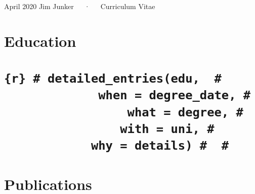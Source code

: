 \documentclass[11pt, a4paper]{awesome-cv}
\begin{document}
\makecvheader

\makecvfooter
  {April 2020}
    {Jim Junker~~~·~~~Curriculum Vitae}
  {\thepage}





\hypertarget{education}{%
\section{Education}\label{education}}

\hypertarget{r-detailed_entriesedu-when-degree_date-what-degree-with-uni-why-details}{%
\section{\texorpdfstring{\texttt{\{r\}\ \#\ detailed\_entries(edu,\ \ \#\ \ \ \ \ \ \ \ \ \ \ \ \ \ \ \ \ \ when\ =\ degree\_date,\ \#\ \ \ \ \ \ \ \ \ \ \ \ \ \ \ \ \ \ what\ =\ degree,\ \#\ \ \ \ \ \ \ \ \ \ \ \ \ \ \ \ \ \ with\ =\ uni,\ \#\ \ \ \ \ \ \ \ \ \ \ \ \ \ \ \ \ \ why\ =\ details)\ \#\ \ \#}}{\{r\} \# detailed\_entries(edu,  \#                  when = degree\_date, \#                  what = degree, \#                  with = uni, \#                  why = details) \#  \#}}\label{r-detailed_entriesedu-when-degree_date-what-degree-with-uni-why-details}}

\hypertarget{publications}{%
\section{Publications}\label{publications}}
\end{document}
